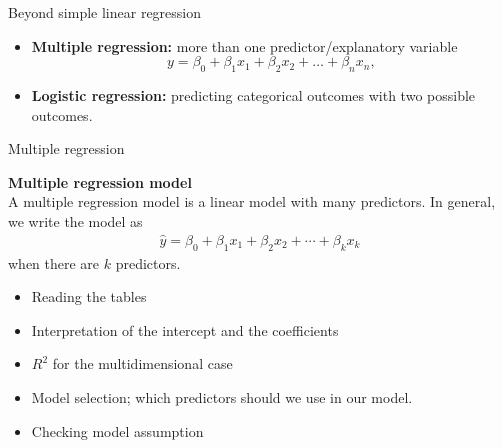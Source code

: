 \documentclass[12pt,a4paper]{beamer}
\begin{document}
\begin{frame}{Beyond simple linear regression}
	\begin{itemize}
		\item \textbf{Multiple regression:} more than one predictor/explanatory variable
		\[y=\beta_0+\beta_1x_1+\beta_2x_2+\dots+\beta_nx_n,\]
		\item \textbf{Logistic regression:} predicting categorical outcomes with two possible outcomes.
			\end{itemize}
\end{frame}
\begin{frame}{Multiple regression}

	\begin{framed}\small
		\textbf{Multiple regression model}\\
	A multiple regression model is a linear model with many predictors. In general, we write the model as
	\begin{align*}
	\hat{y} = \beta_0 + \beta_1 x_1 + \beta_2 x_2 + \cdots + \beta_k x_k %
	\end{align*}
	when there are $k$ predictors. 
	\end{framed}
	\small
	\begin{itemize}
		\item Reading the tables
		\item Interpretation of the intercept and the coefficients
		\item $R^2$ for the multidimensional case
		\item Model selection; which predictors should we use in our model.
		\item Checking model assumption
	\end{itemize}
\end{frame}
\end{document}
